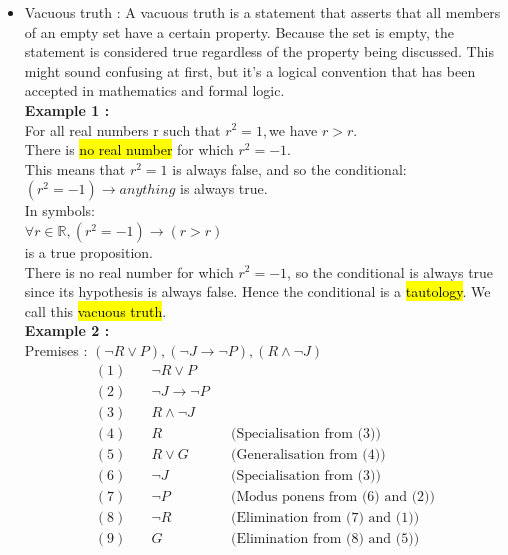 \documentclass{article}
\begin{document}
\begin{itemize}
================================================================================================================
\newpage
================================================================================================================

\item Vacuous truth : A vacuous truth is a statement that asserts that all members of an empty set have a certain property. Because the set is empty, the statement is considered true regardless of the property being discussed. This might sound confusing at first, but it's a logical convention that has been accepted in mathematics and formal logic.\\

\textbf{Example 1 :}\\
For all real numbers r such that $r^2 = 1, $we have $r > r.$\\
There is \hl{no real number} for which $r^2 = -1$.\\
This means that $r^2 = 1$ is always false, and so the conditional:\\
$(r^2 = -1) \rightarrow anything$ is always true.\\
In symbols:\\
$\forall r \in \mathbb{R},(r^2 = -1) \rightarrow (r > r)$\\
is a true proposition.\\
There is no real number for which $r^2 = -1$, so the conditional is always
true since its hypothesis is always false. Hence the conditional is a
\hl{tautology}. We call this \hl{vacuous truth}.\\

\textbf{Example 2 :}\\
Premises : $(\neg R \lor P),(\neg J \rightarrow \neg P),(R \land \neg J)$\\
\begin{align}
(1) \quad & \neg R \lor P \\
(2) \quad & \neg J \rightarrow \neg P \\
(3) \quad & R \land \neg J \\
(4) \quad & R &&\text{(Specialisation from (3))} \\
(5) \quad & R \lor G &&\text{(Generalisation from (4))} \\
(6) \quad & \neg J &&\text{(Specialisation from (3))} \\
(7) \quad & \neg P &&\text{(Modus ponens from (6) and (2))} \\
(8) \quad & \neg R &&\text{(Elimination from (7) and (1))} \\
(9) \quad & G &&\text{(Elimination from (8) and (5))}
\end{align}


\end{itemize}
\end{document}
